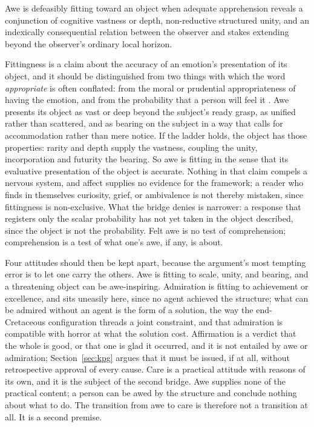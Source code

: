 \begin{premise}\label{prem:awe}
Awe is defeasibly fitting toward an object when adequate apprehension
reveals a conjunction of cognitive vastness or depth, non-reductive
structured unity, and an indexically consequential relation between the
observer and stakes extending beyond the observer's ordinary local
horizon.
\end{premise}

\noindent Fittingness is a claim about the accuracy of an emotion's
presentation of its object, and it should be distinguished from two things
with which the word \emph{appropriate} is often conflated: from the moral or
prudential appropriateness of having the emotion, and from the probability
that a person will feel it \cite{DArmsJacobson00}. Awe presents its object as
vast or deep beyond the subject's ready grasp, as unified rather than
scattered, and as bearing on the subject in a way that calls for accommodation
rather than mere notice. If the ladder holds, the object has those properties:
rarity and depth supply the vastness, coupling the unity, incorporation and
futurity the bearing. So awe is fitting in the sense that its evaluative
presentation of the object is accurate. Nothing in that claim compels a
nervous system, and affect supplies no evidence for the framework; a reader
who finds in themselves curiosity, grief, or ambivalence is not thereby
mistaken, since fittingness is non-exclusive. What the bridge denies is narrower: a response that registers only
the scalar probability has not yet taken in the object described, since the
object is not the probability. Felt awe is no test of comprehension;
comprehension is a test of what one's awe, if any, is about.

Four attitudes should then be kept apart, because the argument's most tempting
error is to let one carry the others. Awe is fitting to scale, unity, and
bearing, and a threatening object can be awe-inspiring. Admiration is fitting
to achievement or excellence, and sits uneasily here, since no agent achieved
the structure; what can be admired without an agent is the form of a solution,
the way the end-Cretaceous configuration threads a joint constraint, and that
admiration is compatible with horror at what the solution cost. Affirmation is
a verdict that the whole is good, or that one is glad it occurred, and it is
not entailed by awe or admiration; Section~\ref{sec:kpg} argues that it must
be issued, if at all, without retrospective approval of every cause. Care is a
practical attitude with reasons of its own, and it is the subject of the
second bridge. Awe supplies none of the practical content; a person can be
awed by the structure and conclude nothing about what to do. The transition
from awe to care is therefore not a transition at all. It is a second
premise.

